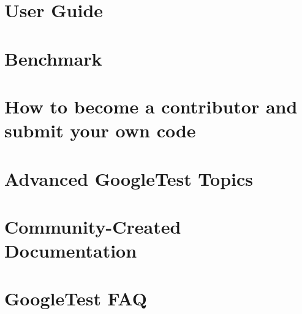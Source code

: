 \let\mypdfximage\pdfximage\def\pdfximage{\immediate\mypdfximage}\documentclass[twoside]{book}
\newcommand{\+}{\discretionary{\mbox{\scriptsize$\hookleftarrow$}}{}{}}
\begin{document}
\chapter{User Guide}
\label{md__home_mary_VegaProgramEngineering_2024_build__deps_googlebenchmark-src_docs_user_guide}

\chapter{Benchmark}
\label{md__home_mary_VegaProgramEngineering_2024_build__deps_googlebenchmark-src_README}

\chapter{How to become a contributor and submit your own code}
\label{md__home_mary_VegaProgramEngineering_2024_build__deps_googletest-src_CONTRIBUTING}

\chapter{Advanced Google\+Test Topics}
\label{md__home_mary_VegaProgramEngineering_2024_build__deps_googletest-src_docs_advanced}

\chapter{Community-\/\+Created Documentation}
\label{md__home_mary_VegaProgramEngineering_2024_build__deps_googletest-src_docs_community_created_documentation}

\chapter{Google\+Test F\+AQ}
\label{md__home_mary_VegaProgramEngineering_2024_build__deps_googletest-src_docs_faq}

\end{document}
